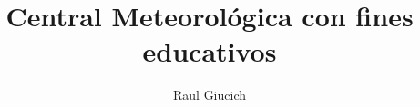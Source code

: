 \documentclass[11pt, spanish]{report}
\title{Central Meteorológica con fines educativos}
\author{Raul Giucich}
\begin{document}
\maketitle

\begin{abstract}
\end{abstract}
\end{document}
